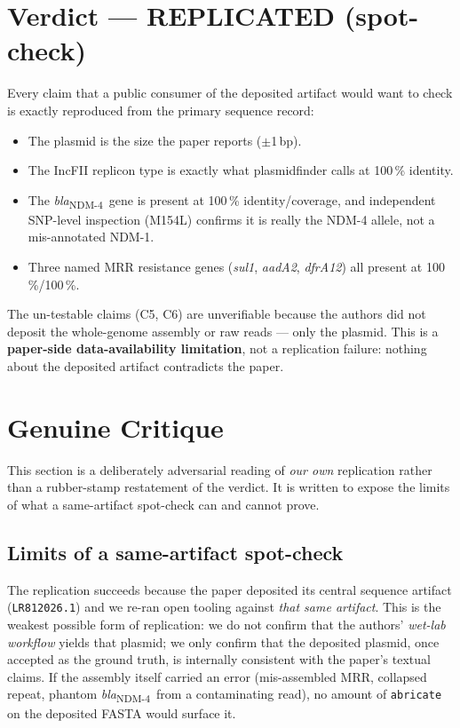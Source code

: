 \documentclass[11pt,a4paper]{article}
\newcommand{\blaNDMfour}{\textit{bla}\textsubscript{NDM-4}}
\begin{document}
\section{Verdict --- REPLICATED (spot-check)}

Every claim that a public consumer of the deposited artifact would want
to check is exactly reproduced from the primary sequence record:
\begin{itemize}
    \item The plasmid is the size the paper reports ($\pm$1\,bp).
    \item The IncFII replicon type is exactly what plasmidfinder calls at
        100\,\% identity.
    \item The \blaNDMfour\ gene is present at 100\,\% identity/coverage,
        and independent SNP-level inspection (M154L) confirms it is really
        the NDM-4 allele, not a mis-annotated NDM-1.
    \item Three named MRR resistance genes (\textit{sul1}, \textit{aadA2},
        \textit{dfrA12}) all present at 100\,\%/100\,\%.
\end{itemize}

The un-testable claims (C5, C6) are unverifiable because the authors did
not deposit the whole-genome assembly or raw reads --- only the plasmid.
This is a \textbf{paper-side data-availability limitation}, not a
replication failure: nothing about the deposited artifact contradicts
the paper.

\section{Genuine Critique}

This section is a deliberately adversarial reading of \emph{our own}
replication rather than a rubber-stamp restatement of the verdict.
It is written to expose the limits of what a same-artifact spot-check
can and cannot prove.

\subsection*{Limits of a same-artifact spot-check}

The replication succeeds because the paper deposited its central
sequence artifact (\texttt{LR812026.1}) and we re-ran open tooling
against \emph{that same artifact}. This is the weakest possible form
of replication: we do not confirm that the authors' \emph{wet-lab
workflow} yields that plasmid; we only confirm that the deposited
plasmid, once accepted as the ground truth, is internally consistent
with the paper's textual claims. If the assembly itself carried an
error (mis-assembled MRR, collapsed repeat, phantom \blaNDMfour\ from
a contaminating read), no amount of \texttt{abricate} on the deposited
FASTA would surface it.
\end{document}
